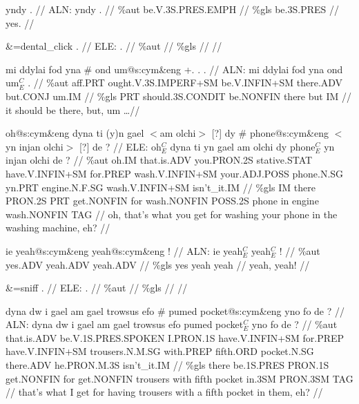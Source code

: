 \documentclass[a4paper,10pt]{article}
\begin{document}
\ex
\begingl[lingstyle=gergl]
\glchat yndy . //
\glsurface ALN:  yndy .  //
\glauto \%aut  be{\scriptsize .V.3S.PRES.EMPH}   //
\glmanual \%gls  be{\scriptsize .3S.PRES}   //
\gleng yes. //
\endgl
\xe

\ex
\begingl[lingstyle=gergl]
\glchat \&=dental\_click . //
\glsurface ELE:  .  //
\glauto \%aut    //
\glmanual \%gls    //
\gleng  //
\endgl
\xe

\ex
\begingl[lingstyle=gergl]
\glchat mi ddylai fod yna \# ond um@s:cym\&eng +. . . //
\glsurface ALN:  mi ddylai fod yna ond um$^{C}_{E}$ .  //
\glauto \%aut  aff{\scriptsize .PRT} ought{\scriptsize .V.3S.IMPERF+SM} be{\scriptsize .V.INFIN+SM} there{\scriptsize .ADV} but{\scriptsize .CONJ} um{\scriptsize .IM}   //
\glmanual \%gls  PRT should{\scriptsize .3S.CONDIT} be{\scriptsize .NONFIN} there but IM   //
\gleng it should be there, but, um \dots  //
\endgl
\xe

\ex
\begingl[lingstyle=gergl]
\glchat oh@s:cym\&eng dyna ti (y)n gael $<$am olchi$>$ [?] dy \# phone@s:cym\&eng $<$yn injan olchi$>$ [?] de ? //
\glsurface ELE:  oh$^{C}_{E}$ dyna ti yn gael am olchi dy phone$^{C}_{E}$ yn injan olchi de ?  //
\glauto \%aut  oh{\scriptsize .IM} that{\scriptsize .is.ADV} you{\scriptsize .PRON.2S} stative{\scriptsize .STAT} have{\scriptsize .V.INFIN+SM} for{\scriptsize .PREP} wash{\scriptsize .V.INFIN+SM} your{\scriptsize .ADJ.POSS} phone{\scriptsize .N.SG} yn{\scriptsize .PRT} engine{\scriptsize .N.F.SG} wash{\scriptsize .V.INFIN+SM} isn't\_it{\scriptsize .IM}   //
\glmanual \%gls  IM there PRON{\scriptsize .2S} PRT get{\scriptsize .NONFIN} for wash{\scriptsize .NONFIN} POSS{\scriptsize .2S} phone in engine wash{\scriptsize .NONFIN} TAG   //
\gleng oh, that's what you get for washing your phone in the washing machine, eh? //
\endgl
\xe

\ex
\begingl[lingstyle=gergl]
\glchat ie yeah@s:cym\&eng yeah@s:cym\&eng ! //
\glsurface ALN:  ie yeah$^{C}_{E}$ yeah$^{C}_{E}$ !  //
\glauto \%aut  yes{\scriptsize .ADV} yeah{\scriptsize .ADV} yeah{\scriptsize .ADV}   //
\glmanual \%gls  yes yeah yeah   //
\gleng yeah, yeah! //
\endgl
\xe

\ex
\begingl[lingstyle=gergl]
\glchat \&=sniff . //
\glsurface ELE:  .  //
\glauto \%aut    //
\glmanual \%gls    //
\gleng  //
\endgl
\xe

\ex
\begingl[lingstyle=gergl]
\glchat dyna dw i gael am gael trowsus efo \# pumed pocket@s:cym\&eng yno fo de ? //
\glsurface ALN:  dyna dw i gael am gael trowsus efo pumed pocket$^{C}_{E}$ yno fo de ?  //
\glauto \%aut  that{\scriptsize .is.ADV} be{\scriptsize .V.1S.PRES.SPOKEN} I{\scriptsize .PRON.1S} have{\scriptsize .V.INFIN+SM} for{\scriptsize .PREP} have{\scriptsize .V.INFIN+SM} trousers{\scriptsize .N.M.SG} with{\scriptsize .PREP} fifth{\scriptsize .ORD} pocket{\scriptsize .N.SG} there{\scriptsize .ADV} he{\scriptsize .PRON.M.3S} isn't\_it{\scriptsize .IM}   //
\glmanual \%gls  there be{\scriptsize .1S.PRES} PRON{\scriptsize .1S} get{\scriptsize .NONFIN} for get{\scriptsize .NONFIN} trousers with fifth pocket in{\scriptsize .3SM} PRON{\scriptsize .3SM} TAG   //
\gleng that's what I get for having trousers with a fifth pocket in them, eh? //
\endgl
\xe
\end{document}
